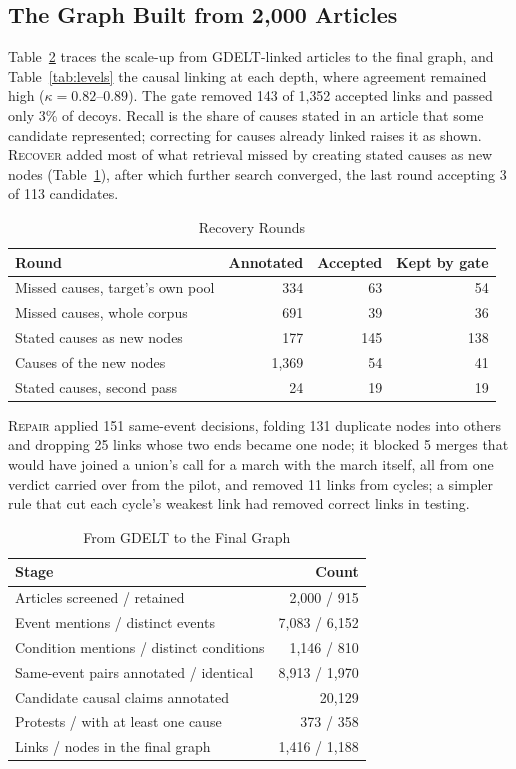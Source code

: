 \documentclass[conference]{IEEEtran}
\begin{document}
\subsection{The Graph Built from 2{,}000 Articles}
Table~\ref{tab:funnel} traces the scale-up from GDELT-linked articles to the final graph, and
Table~\ref{tab:levels} the causal linking at each depth, where agreement remained high
($\kappa=0.82$--$0.89$). The gate removed 143 of 1{,}352 accepted links and passed only 3\% of
decoys. Recall is the share of causes stated in an article that some candidate represented;
correcting for causes already linked raises it as shown. \textsc{Recover} added most of what
retrieval missed by creating stated causes as new nodes (Table~\ref{tab:rescue}), after which
further search converged, the last round accepting 3 of 113 candidates.

\begin{table}[t]
\caption{Recovery Rounds}
\label{tab:rescue}
\centering
\footnotesize
\begin{tabular}{@{}lrrr@{}}
\toprule
Round & Annotated & Accepted & Kept by gate \\
\midrule
Missed causes, target's own pool & 334 & 63 & 54 \\
Missed causes, whole corpus & 691 & 39 & 36 \\
Stated causes as new nodes & 177 & 145 & 138 \\
Causes of the new nodes & 1{,}369 & 54 & 41 \\
Stated causes, second pass & 24 & 19 & 19 \\
\bottomrule
\end{tabular}
\end{table} \textsc{Repair} applied
151 same-event decisions, folding 131 duplicate nodes into others and dropping 25 links whose two
ends became one node; it blocked 5 merges that would have joined a union's call for a march with
the march itself, all from one verdict carried over from the pilot, and removed 11 links from
cycles; a simpler rule that cut each cycle's weakest link
had removed correct links in testing.

\begin{table}[t]
\caption{From GDELT to the Final Graph}
\label{tab:funnel}
\centering
\footnotesize
\begin{tabular}{@{}lr@{}}
\toprule
Stage & Count \\
\midrule
Articles screened / retained & 2{,}000 / 915 \\
Event mentions / distinct events & 7{,}083 / 6{,}152 \\
Condition mentions / distinct conditions & 1{,}146 / 810 \\
Same-event pairs annotated / identical & 8{,}913 / 1{,}970 \\
Candidate causal claims annotated & 20{,}129 \\
Protests / with at least one cause & 373 / 358 \\
Links / nodes in the final graph & 1{,}416 / 1{,}188 \\
\bottomrule
\end{tabular}
\end{table}
\end{document}
